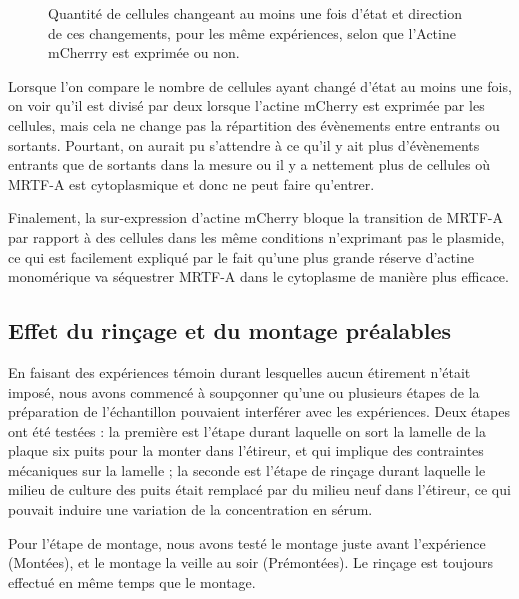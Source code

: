 \documentclass{report}
\begin{document}
\begin{figure}
\caption{\label{AMC}Répartition initiale pour des cellules issues des même expériences exprimant ou non le plasmide Actine mCherry. **** : $p<10^{-4}$}\caption{\label{AMC_transloc}Quantité de cellules changeant au moins une fois d'état et direction de ces changements, pour les même expériences, selon que l'Actine mCherrry est exprimée ou non.}
\end{figure}

Lorsque l'on compare le nombre de cellules ayant changé d'état au moins une fois, on voir qu'il est divisé par deux lorsque l'actine mCherry est exprimée par les cellules, mais cela ne change pas la répartition des évènements entre entrants ou sortants. 
Pourtant, on aurait pu s'attendre à ce qu'il y ait plus d'évènements entrants que de sortants dans la mesure ou il y a nettement plus de cellules où MRTF-A est cytoplasmique et donc ne peut faire qu'entrer. 

Finalement, la sur-expression d'actine mCherry bloque la transition de MRTF-A par rapport à des cellules dans les même conditions n'exprimant pas le plasmide, ce qui est facilement expliqué par le fait qu'une plus grande réserve d'actine monomérique va séquestrer MRTF-A dans le cytoplasme de manière plus efficace.

\subsection{Effet du rinçage et du montage préalables \label{Rinçage}}

En faisant des expériences témoin durant lesquelles aucun étirement n'était imposé, nous avons commencé à soupçonner qu'une ou plusieurs étapes de la préparation de l'échantillon pouvaient interférer avec les expériences. 
Deux étapes ont été testées : la première est l'étape durant laquelle on sort la lamelle de la plaque six puits pour la monter dans l'étireur, et qui implique des contraintes mécaniques sur la lamelle ; la seconde est l'étape de rinçage durant laquelle le milieu de culture des puits était remplacé par du milieu neuf dans l'étireur, ce qui pouvait induire une variation de la concentration en sérum. 

Pour l'étape de montage, nous avons testé le montage juste avant l'expérience (Montées), et le montage la veille au soir (Prémontées). 
Le rinçage est toujours effectué en même temps que le montage. 
\end{document}
